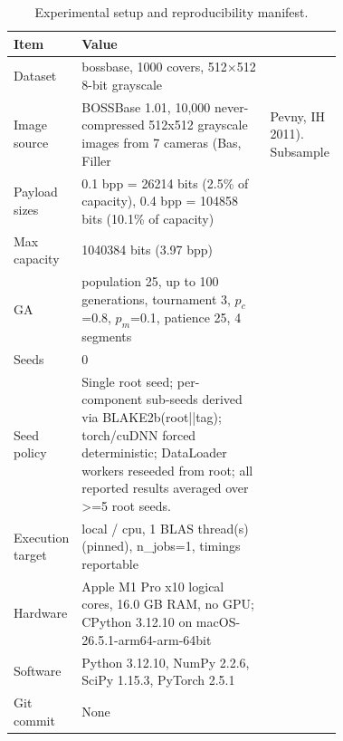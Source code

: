 \begin{table}[!t]
\centering
\caption{Experimental setup and reproducibility manifest.}
\label{tab:repro}
\footnotesize
\begin{tabular}{lp{0.72\linewidth}}
\toprule
Item & Value \\
\midrule
Dataset & bossbase, 1000 covers, 512$\times$512 8-bit grayscale \\
Image source & BOSSBase 1.01, 10,000 never-compressed 512x512 grayscale images from 7 cameras (Bas, Filler & Pevny, IH 2011). Subsample \\
Payload sizes & 0.1 bpp = 26214 bits (2.5\% of capacity), 0.4 bpp = 104858 bits (10.1\% of capacity) \\
Max capacity & 1040384 bits (3.97 bpp) \\
GA & population 25, up to 100 generations, tournament 3, $p_c$=0.8, $p_m$=0.1, patience 25, 4 segments \\
Seeds & 0 \\
Seed policy & Single root seed; per-component sub-seeds derived via BLAKE2b(root||tag); torch/cuDNN forced deterministic; DataLoader workers reseeded from root; all reported results averaged over >=5 root seeds. \\
Execution target & local / cpu, 1 BLAS thread(s) (pinned), n\_jobs=1, timings reportable \\
Hardware & Apple M1 Pro x10 logical cores, 16.0 GB RAM, no GPU; CPython 3.12.10 on macOS-26.5.1-arm64-arm-64bit \\
Software & Python 3.12.10, NumPy 2.2.6, SciPy 1.15.3, PyTorch 2.5.1 \\
Git commit & None \\
\bottomrule
\end{tabular}
\end{table}
